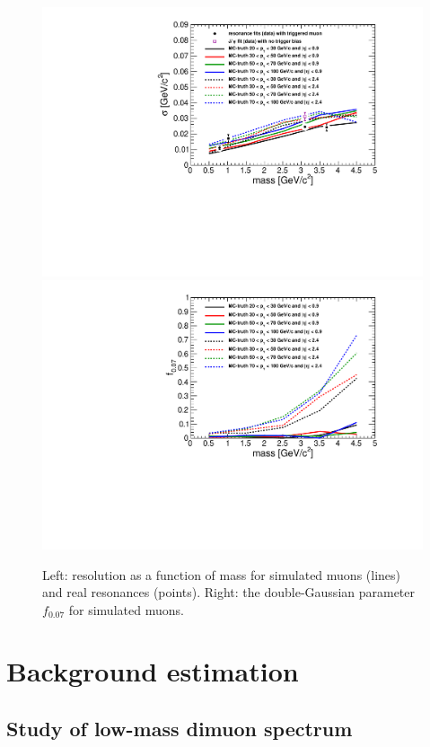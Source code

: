 \documentclass[12pt]{cms-tdr}
\begin{document}
\begin{figure}
\includegraphics[width=0.5\linewidth]{PLOTS/resolution.pdf}
\includegraphics[width=0.5\linewidth]{PLOTS/resolution_f007.pdf}

\caption{Left: resolution as a function of mass for simulated muons
  (lines) and real resonances (points).  Right: the double-Gaussian
  parameter $f_{0.07}$ for simulated muons. \label{fig:resolution}}
\end{figure}

\section{Background estimation}

\subsection{Study of low-mass dimuon spectrum}

\end{document}
